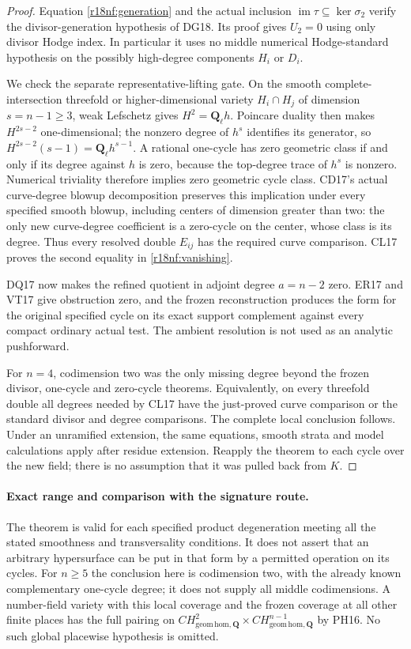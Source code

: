 \begin{proof}
Equation \eqref{r18nf:generation} and the actual inclusion
$\operatorname{im}\tau\subseteq\ker\sigma_2$ verify the
divisor-generation hypothesis of DG18.  Its proof gives
$U_2=0$ using only divisor Hodge index.  In particular it
uses no middle numerical Hodge-standard hypothesis on
the possibly high-degree components $H_i$ or $D_i$.

We check the separate representative-lifting gate.  On the
smooth complete-intersection threefold or higher-dimensional
variety $H_i\cap H_j$ of dimension $s=n-1\ge3$, weak
Lefschetz gives $H^2=\mathbf Q_\ell h$.  Poincare duality
then makes $H^{2s-2}$ one-dimensional; the nonzero degree of
$h^s$ identifies its generator, so
$H^{2s-2}(s-1)=\mathbf Q_\ell h^{s-1}$.
A rational one-cycle has zero geometric class if and only if
its degree against $h$ is zero, because the top-degree
trace of $h^s$ is nonzero.  Numerical triviality therefore
implies zero geometric cycle class.  CD17's actual
curve-degree blowup decomposition preserves this implication
under every specified smooth blowup, including centers of
dimension greater than two: the only new curve-degree
coefficient is a zero-cycle on the center, whose class is
its degree.  Thus every resolved double $E_{ij}$ has the
required curve comparison.  CL17 proves the second
equality in \eqref{r18nf:vanishing}.

DQ17 now makes the refined quotient in adjoint degree
$a=n-2$ zero.  ER17 and VT17 give obstruction zero, and
the frozen reconstruction produces the form for the
original specified cycle on its exact support complement
against every compact ordinary actual test.  The ambient
resolution is not used as an analytic pushforward.

For $n=4$, codimension two was the only missing degree
beyond the frozen divisor, one-cycle and zero-cycle
theorems.  Equivalently, on every threefold double all
degrees needed by CL17 have the just-proved curve comparison
or the standard divisor and degree comparisons.  The
complete local conclusion follows.  Under an unramified
extension, the same equations, smooth strata and model
calculations apply after residue extension.  Reapply the
theorem to each cycle over the new field; there is no
assumption that it was pulled back from $K$.
\end{proof}

\paragraph{Exact range and comparison with the signature route.}
The theorem is valid for each specified product degeneration
meeting all the stated smoothness and transversality conditions.
It does not assert that an arbitrary hypersurface can be put
in that form by a permitted operation on its cycles.
For $n\ge5$ the conclusion here is codimension two, with
the already known complementary one-cycle degree; it does
not supply all middle codimensions.  A number-field variety
with this local coverage and the frozen coverage at all
other finite places has the full pairing on
$CH^2_{\mathrm{geom\,hom},\mathbf Q}\times
CH^{n-1}_{\mathrm{geom\,hom},\mathbf Q}$ by PH16.
No such global placewise hypothesis is omitted.

